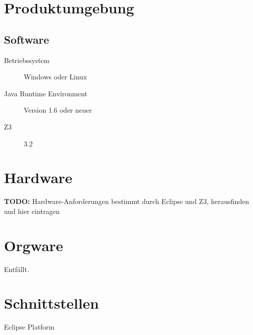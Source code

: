 \section{Produktumgebung}%

\subsection{Software}%

\begin{description}%
    \item [Betriebssystem] \see Windows oder \see Linux%
    \item [\see Java Runtime Environment] Version 1.6 oder neuer%
    \item [\see Z3] 3.2%
\end{description}%

\section{Hardware}%

\textbf{TODO:} Hardware-Anforderungen bestimmt durch Eclipse und Z3, herausfinden und hier eintragen%

\section{\see Orgware}%

Entfällt.%

\section{Schnittstellen}%

\begin{description}%
    \item [\see Eclipse Platform]%
\end{description}%
